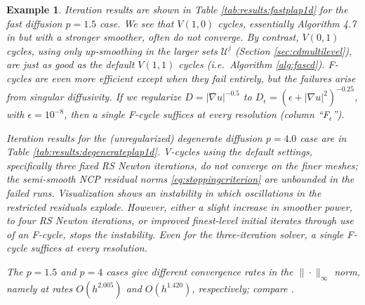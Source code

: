 \documentclass[letterpaper,final,12pt,reqno]{amsart}
\theoremstyle{cstyle}
\theoremstyle{cstyle*}
\theoremstyle{dstyle}
\newtheorem{example}[theorem]{Example}
\numberwithin{equation}{section}
\numberwithin{figure}{section}
\numberwithin{table}{section}
\numberwithin{theorem}{section}
\newcommand{\eps}{\epsilon}
\newcommand{\grad}{\nabla}
\begin{document}
\begin{example}
Iteration results are shown in Table \ref{tab:results:fastplap1d} for the fast diffusion $p=1.5$ case.  We see that $V(1,0)$ cycles, essentially Algorithm 4.7 in \cite{GraeserKornhuber2009} but with a stronger smoother, often do not converge.  By contrast, $V(0,1)$ cycles, using only up-smoothing in the larger sets $\mathcal{U}^j$ (Section \ref{sec:cdmultilevel}), are just as good as the default $V(1,1)$ cycles (i.e.~Algorithm \ref{alg:fascd}).  F-cycles are even more efficient except when they fail entirely, but the failures arise from singular diffusivity.  If we regularize  $D=|\grad u|^{-0.5}$ to $D_\eps = \left(\eps + |\grad u|^2\right)^{-0.25}$, with $\eps=10^{-8}$, then a single F-cycle suffices at every resolution (column ``F$_\eps$'').

Iteration results for the (unregularized) degenerate diffusion $p=4.0$ case are in Table \ref{tab:results:degenerateplap1d}.  V-cycles using the default settings, specifically three fixed RS Newton iterations, do not converge on the finer meshes; the semi-smooth NCP residual norms \eqref{eq:stoppingcriterion} are unbounded in the failed runs.  Visualization shows an instability in which oscillations in the restricted residuals explode.  However, either a slight increase in smoother power, to four RS Newton iterations, or improved finest-level initial iterates through use of an F-cycle, stops the instability.  Even for the three-iteration solver, a single F-cycle suffices at every resolution.

The $p=1.5$ and $p=4$ cases give different convergence rates in the $\|\cdot\|_\infty$ norm, namely at rates $O(h^{2.005})$ and $O(h^{1.420})$, respectively; compare \cite{ChoeLewis1991}.
\end{example}
\end{document}
